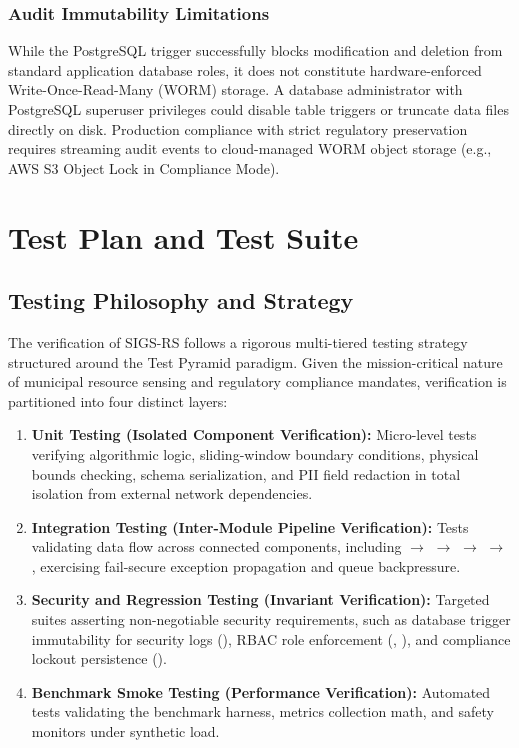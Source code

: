 \documentclass[a4paper]{article}
\begin{document}
\subsubsection{Audit Immutability Limitations}
While the PostgreSQL trigger  successfully blocks modification and deletion from standard application database roles, it does not constitute hardware-enforced Write-Once-Read-Many (WORM) storage. A database administrator with PostgreSQL superuser privileges could disable table triggers or truncate data files directly on disk. Production compliance with strict regulatory preservation requires streaming audit events to cloud-managed WORM object storage (e.g., AWS S3 Object Lock in Compliance Mode).

\section{Test Plan and Test Suite}

\subsection{Testing Philosophy and Strategy}
The verification of SIGS-RS follows a rigorous multi-tiered testing strategy structured around the Test Pyramid paradigm. Given the mission-critical nature of municipal resource sensing and regulatory compliance mandates, verification is partitioned into four distinct layers:
\begin{enumerate}
    \item \textbf{Unit Testing (Isolated Component Verification):} Micro-level tests verifying algorithmic logic, sliding-window boundary conditions, physical bounds checking, schema serialization, and PII field redaction in total isolation from external network dependencies.
    \item \textbf{Integration Testing (Inter-Module Pipeline Verification):} Tests validating data flow across connected components, including  $\to$  $\to$  $\to$  $\to$ , exercising fail-secure exception propagation and queue backpressure.
    \item \textbf{Security and Regression Testing (Invariant Verification):} Targeted suites asserting non-negotiable security requirements, such as database trigger immutability for security logs (), RBAC role enforcement (, ), and compliance lockout persistence ().
    \item \textbf{Benchmark Smoke Testing (Performance Verification):} Automated tests validating the benchmark harness, metrics collection math, and safety monitors under synthetic load.
\end{enumerate}
\end{document}
